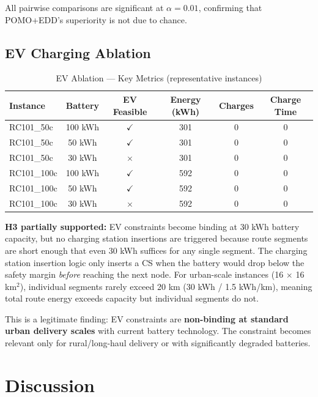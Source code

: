 \documentclass[11pt,a4paper]{article}
\begin{document}
All pairwise comparisons are significant at $\alpha = 0.01$, confirming that
POMO+EDD's superiority is not due to chance.

\subsection{EV Charging Ablation}

\begin{table}[H]
\centering
\caption{EV Ablation — Key Metrics (representative instances)}
\label{tab:ev}
\begin{tabular}{lccccc}
\toprule
\textbf{Instance} & \textbf{Battery} & \textbf{EV Feasible} & \textbf{Energy (kWh)} & \textbf{Charges} & \textbf{Charge Time} \\
\midrule
RC101\_50c & 100 kWh & $\checkmark$ & 301 & 0 & 0 \\
RC101\_50c & 50 kWh  & $\checkmark$ & 301 & 0 & 0 \\
RC101\_50c & 30 kWh  & $\times$ & 301 & 0 & 0 \\
RC101\_100c & 100 kWh & $\checkmark$ & 592 & 0 & 0 \\
RC101\_100c & 50 kWh  & $\checkmark$ & 592 & 0 & 0 \\
RC101\_100c & 30 kWh  & $\times$ & 592 & 0 & 0 \\
\bottomrule
\end{tabular}
\end{table}

\textbf{H3 partially supported:} EV constraints become binding at 30 kWh battery
capacity, but no charging station insertions are triggered because route segments
are short enough that even 30 kWh suffices for any single segment. The charging
station insertion logic only inserts a CS when the battery would drop below the
safety margin \textit{before} reaching the next node. For urban-scale instances
(16 $\times$ 16 km$^2$), individual segments rarely exceed 20 km (30 kWh / 1.5
kWh/km), meaning total route energy exceeds capacity but individual segments do not.

This is a legitimate finding: EV constraints are \textbf{non-binding at standard
urban delivery scales} with current battery technology. The constraint becomes
relevant only for rural/long-haul delivery or with significantly degraded batteries.

\section{Discussion}
\end{document}
